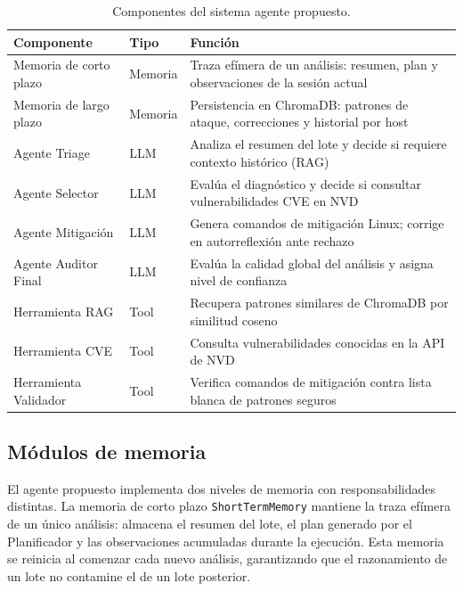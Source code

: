 \begin{table}[H]
\centering
\caption{Componentes del sistema agente propuesto.}
\label{tab:componentes}
\renewcommand{\arraystretch}{1.3}
\begin{tabularx}{\textwidth}{p{3.2cm} >{\centering\arraybackslash}p{2.0cm} X}
\toprule
\textbf{Componente} & \textbf{Tipo} & \textbf{Función} \\
\midrule
Memoria de corto plazo  & Memoria  & Traza efímera de un análisis: resumen, plan y observaciones de la sesión actual \\
Memoria de largo plazo  & Memoria  & Persistencia en ChromaDB: patrones de ataque, correcciones y historial por host \\
Agente Triage           & LLM      & Analiza el resumen del lote y decide si requiere contexto histórico (RAG) \\
Agente Selector         & LLM      & Evalúa el diagnóstico y decide si consultar vulnerabilidades CVE en NVD \\
Agente Mitigación       & LLM      & Genera comandos de mitigación Linux; corrige en autorreflexión ante rechazo \\
Agente Auditor Final    & LLM      & Evalúa la calidad global del análisis y asigna nivel de confianza \\
Herramienta RAG         & Tool     & Recupera patrones similares de ChromaDB por similitud coseno \\
Herramienta CVE         & Tool     & Consulta vulnerabilidades conocidas en la API de NVD \\
Herramienta Validador   & Tool     & Verifica comandos de mitigación contra lista blanca de patrones seguros \\
\bottomrule
\end{tabularx}
\end{table}

\subsection{Módulos de memoria}

El agente propuesto implementa dos niveles de memoria con
responsabilidades distintas. La memoria de corto plazo \texttt{ShortTermMemory} mantiene la traza efímera de un
único análisis: almacena el resumen del lote, el plan generado
por el Planificador y las observaciones acumuladas durante la
ejecución. Esta memoria se reinicia al comenzar cada nuevo
análisis, garantizando que el razonamiento de un lote no
contamine el de un lote posterior.

